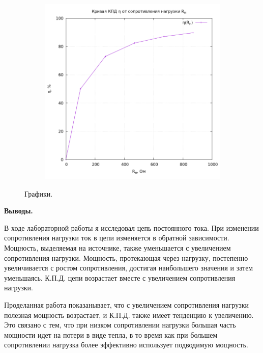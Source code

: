 \documentclass[12pt, a4paper]{report}
\begin{document}
\begin{enumerate}
\begin{figure}[H]
\begin{subfigure}{0.5\linewidth}
				\end{subfigure}
				\begin{subfigure}{0.5\linewidth}
					\includegraphics[width=\linewidth]{n_R.png}
				\end{subfigure}

				\caption{Графики.}
				\label{plots}
			\end{figure}
	\end{enumerate}

	\begin{center}
		\textbf{Выводы.}
	\end{center}
	\par В ходе лабораторной работы я исследовал цепь постоянного тока. При изменении сопротивления нагрузки ток в цепи изменяется в обратной зависимости. Мощность, выделяемая на источнике, также уменьшается с увеличением сопротивления нагрузки. Мощность, протекающая через нагрузку, постепенно увеличивается с ростом сопротивления, достигая наибольшего значения и затем уменьшаясь. К.П.Д. цепи возрастает вместе с увеличением сопротивления нагрузки.
	\par Проделанная работа показанывает, что с увеличением сопротивления нагрузки полезная мощность возрастает, и К.П.Д. также имеет тенденцию к увеличению. Это связано с тем, что при низком сопротивлении нагрузки большая часть мощности идет на потери в виде тепла, в то время как при большем сопротивлении нагрузка более эффективно использует подводимую мощность.
\end{document}
